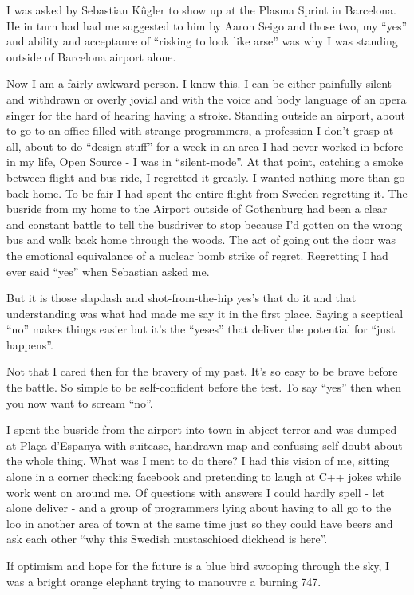 I was asked by Sebastian Kûgler to show up at the Plasma Sprint in Barcelona. He in turn had had me suggested to him by Aaron Seigo and those two, my “yes” and ability and acceptance of “risking to look like arse” was why I was standing outside of Barcelona airport alone.

Now I am a fairly awkward person. I know this. I can be either painfully silent and withdrawn or overly jovial and with the voice and body language of an opera singer for the hard of hearing having a stroke. Standing outside an airport, about to go to an office filled with strange programmers, a profession I don’t grasp at all, about to do “design-stuff” for a week in an area I had never worked in before in my life, Open Source - I was in “silent-mode”. 
At that point, catching a smoke between flight and bus ride, I regretted it greatly. I wanted nothing more than go back home. To be fair I had spent the entire flight from Sweden regretting it. The busride from my home to the Airport outside of Gothenburg had been a clear and constant battle to tell the busdriver to stop because I’d gotten on the wrong bus and walk back home through the woods. The act of going out the door was the emotional equivalance of a nuclear bomb strike of regret. Regretting I had ever said “yes” when Sebastian asked me. 

But it is those slapdash and shot-from-the-hip yes’s that do it and that understanding was what had made me say it in the first place. Saying a sceptical “no” makes things easier but it’s the “yeses” that deliver the potential for “just happens”.

Not that I cared then for the bravery of my past. It’s so easy to be brave before the battle. So simple to be self-confident before the test. To say “yes” then when you now want to scream “no”.

I spent the busride from the airport into town in abject terror and was dumped at Plaça d'Espanya with suitcase, handrawn map and confusing self-doubt about the whole thing.
What was I ment to do there? I had this vision of me, sitting alone in a corner checking facebook and pretending to laugh at C++ jokes while work went on around me. Of questions with answers I could hardly spell - let alone deliver - and a group of programmers lying about having to all go to the loo in another area of town at the same time just so they could have beers and ask each other “why this Swedish mustaschioed dickhead is here”. 

If optimism and hope for the future is a blue bird swooping through the sky, I was a bright orange elephant trying to manouvre a burning 747.

